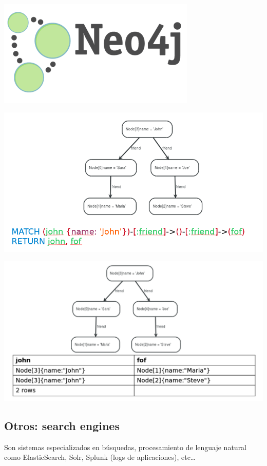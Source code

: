 \documentclass[]{book}
\begin{document}
\includegraphics{images/Neo4jlogo.png}

\includegraphics{images/CypherQuery.png}

\includegraphics{images/CypherResult.png}

\hypertarget{otros-search-engines}{%
\subsection{Otros: search engines}\label{otros-search-engines}}

Son sistemas especializados en búsquedas, procesamiento de lenguaje natural como ElasticSearch, Solr, Splunk (logs de aplicaciones), etc\ldots{}
\end{document}
